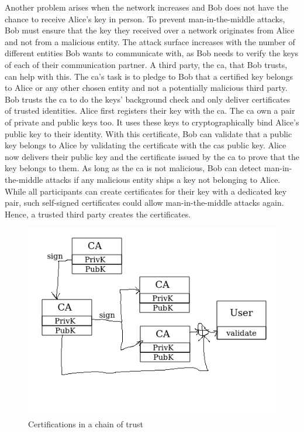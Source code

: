 Another problem arises when the network increases and Bob does not have the
chance to receive Alice's key in person. To prevent man-in-the-middle attacks,
Bob must ensure that the key they received over a network originates from Alice
and not from a malicious entity. The attack surface increases with the number of
different entities Bob wants to communicate with, as Bob needs to verify the
keys of each of their communication partner. A third party, the \gls{ca}, that
Bob trusts, can help with this. The \gls{ca}'s task is to pledge to Bob that a
certified key belongs to Alice or any other chosen entity and not a potentially
malicious third party. Bob trusts the \gls{ca} to do the keys' background check
and only deliver certificates of trusted identities. Alice first registers their
key with the \gls{ca}. The \gls{ca} own a pair of private and public keys too.
It uses these keys to cryptographically bind Alice's public key to their
identity. With this certificate, Bob can validate that a public key belongs to
Alice by validating the certificate with the \glspl{ca} public key. Alice now
delivers their public key and the certificate issued by the \gls{ca} to prove
that the key belongs to them. As long as the \gls{ca} is not malicious, Bob can
detect man-in-the-middle attacks if any malicious entity ships a key not
belonging to Alice. While all participants can create certificates for their key
with a dedicated key pair, such self-signed certificates could allow
man-in-the-middle attacks again. Hence, a trusted third party creates the
certificates.\\

\begin{figure}
    \begin{center}
        \includegraphics[width=.6\textwidth]{images/chain_of_trust_placeholder.png}
        \caption{Certifications in a chain of trust}
        \label{fig:state:technical:chain_of_trust}
    \end{center}
\end{figure}

